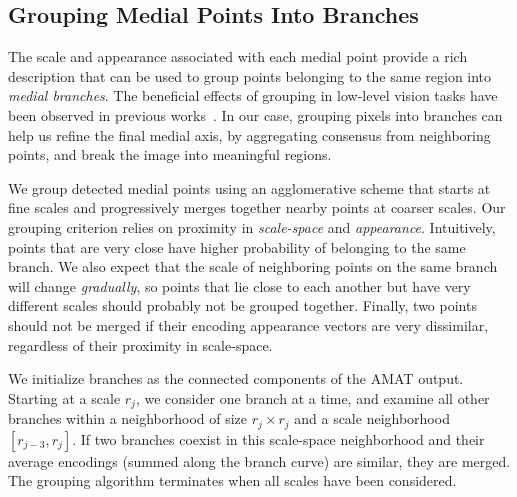 \documentclass[10pt,twocolumn,letterpaper]{article}
\begin{document}
\subsection{Grouping Medial Points Into Branches}\label{sec:method:grouping}
The scale and appearance associated with each medial point provide a rich
description that can be used to group points belonging to the same region into \emph{medial branches}.
The beneficial effects of grouping in low-level vision tasks have been
observed in previous works~\cite{felzenszwalb2006min,zhu2007untangling,kokkinos2010highly,qi2015making}.
In our case, grouping pixels into branches can help us refine the final medial axis, 
by aggregating consensus from neighboring points, and break the image into meaningful regions.

We group detected medial points using an agglomerative scheme that starts at fine scales and
progressively merges together nearby points at coarser scales.
Our grouping criterion relies on proximity in \emph{scale-space} and \emph{appearance}.
Intuitively, points that are very close have higher probability of belonging to the same branch.
We also expect that the scale of neighboring points on the same branch will change \emph{gradually},
so points that lie close to each another but have very different scales should probably not be grouped together.
Finally, two points should not be merged if their encoding appearance vectors are very dissimilar,
regardless of their proximity in scale-space. 

We initialize branches as the connected components of the AMAT output.
Starting at a scale $r_j$, we consider one branch at a time, and examine all other
branches within a neighborhood of size $r_j \times r_j$ and a scale neighborhood $[r_{j-3},r_j]$.
If two branches coexist in this scale-space neighborhood and their average encodings 
(summed along the branch curve) are similar, they are merged.
The grouping algorithm terminates when all scales have been considered.

\end{document}
